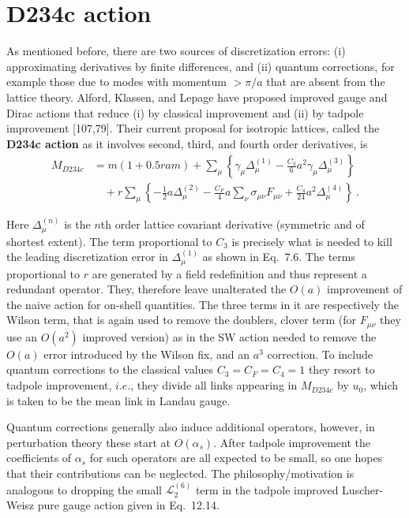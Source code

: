 \section{D234c action}

As mentioned before, there are two sources of discretization errors:
(i) approximating derivatives by finite differences, and (ii) quantum
corrections, for example those due to modes with momentum $> \pi/a$
that are absent from the lattice theory.
Alford, Klassen, and Lepage have proposed improved gauge
and Dirac actions that reduce (i) by classical improvement and (ii)
by tadpole improvement [107,79].  Their current
proposal for isotropic lattices, called the \textbf{D234c action} as
it involves second, third, and fourth order derivatives, is
\begin{align}
M_{D234c}
&= m(1+0.5 r a m) + \sum_\mu \left\{ \gamma_\mu \Delta_\mu^{(1)}
   - \frac{C_3}{6} a^2 \gamma_\mu \Delta_\mu^{(3)} \right\} \nonumber\\
&\quad + r \sum_\mu \left\{ - \frac{1}{2} a \Delta_\mu^{(2)}
   - \frac{C_F}{4} a \sum_\nu \sigma_{\mu\nu} F_{\mu\nu}
   + \frac{C_4}{24} a^2 \Delta_\mu^{(4)} \right\} \ .
\label{eq:D234caction}
\end{align}

Here $\Delta_\mu^{(n)}$ is the $n$th order lattice covariant
derivative (symmetric and of shortest extent).  The term proportional
to $C_3$ is precisely what is needed to kill the leading
discretization error in $\Delta_\mu^{(1)}$ as shown in
Eq.~7.6.  The terms proportional to $r$ are
generated by a field redefinition and thus represent a redundant
operator.  They, therefore leave unalterated the $O(a)$ improvement of
the naive action for on-shell quantities.  The three terms in it are
respectively the Wilson term, that is again used to remove the
doublers, clover term (for $F_{\mu\nu}$ they use an $O(a^2)$ improved
version) as in the SW action needed to remove the $O(a)$ error
introduced by the Wilson fix, and an $a^3$ correction.  To include
quantum corrections to the classical values $C_3 = C_F = C_4 = 1$ they
resort to tadpole improvement, $i.e.$, they divide all links appearing
in $M_{D234c}$ by $u_0$, which is taken to be the mean link in Landau
gauge.

Quantum corrections generally also induce additional operators,
however, in perturbation theory these start at $O(\alpha_s)$.  After
tadpole improvement the coefficients of $\alpha_s$ for such operators
are all expected to be small, so one hopes that their contributions
can be neglected.  The philosophy/motivation is analogous to dropping the small
$\mathcal{L}_2^{(6)}$ term in the tadpole improved Luscher-Weisz pure gauge
action given in Eq.~12.14.

